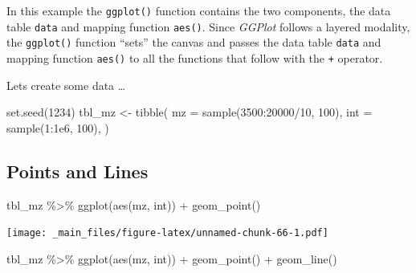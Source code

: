 \documentclass[
]{book}
\newenvironment{Shaded}{\begin{snugshade}}{\end{snugshade}}
\newcommand{\AttributeTok}[1]{\textcolor[rgb]{0.77,0.63,0.00}{#1}}
\newcommand{\DecValTok}[1]{\textcolor[rgb]{0.00,0.00,0.81}{#1}}
\newcommand{\FloatTok}[1]{\textcolor[rgb]{0.00,0.00,0.81}{#1}}
\newcommand{\FunctionTok}[1]{\textcolor[rgb]{0.00,0.00,0.00}{#1}}
\newcommand{\NormalTok}[1]{#1}
\newcommand{\OtherTok}[1]{\textcolor[rgb]{0.56,0.35,0.01}{#1}}
\newcommand{\SpecialCharTok}[1]{\textcolor[rgb]{0.00,0.00,0.00}{#1}}
\begin{document}
In this example the \texttt{ggplot()} function contains the two components, the data table \texttt{data} and mapping function \texttt{aes()}. Since \emph{GGPlot} follows a layered modality, the \texttt{ggplot()} function ``sets'' the canvas and passes the data table \texttt{data} and mapping function \texttt{aes()} to all the functions that follow with the \texttt{+} operator.

Lets create some data \ldots{}

\begin{Shaded}
\begin{Highlighting}[]
\FunctionTok{set.seed}\NormalTok{(}\DecValTok{1234}\NormalTok{)}
\NormalTok{tbl\_mz }\OtherTok{\textless{}{-}} \FunctionTok{tibble}\NormalTok{(}
  \AttributeTok{mz =} \FunctionTok{sample}\NormalTok{(}\DecValTok{3500}\SpecialCharTok{:}\DecValTok{20000}\SpecialCharTok{/}\DecValTok{10}\NormalTok{, }\DecValTok{100}\NormalTok{),}
  \AttributeTok{int =} \FunctionTok{sample}\NormalTok{(}\DecValTok{1}\SpecialCharTok{:}\FloatTok{1e6}\NormalTok{, }\DecValTok{100}\NormalTok{),}
\NormalTok{)}
\end{Highlighting}
\end{Shaded}

\hypertarget{points-and-lines}{%
\subsection{Points and Lines}\label{points-and-lines}}

\begin{Shaded}
\begin{Highlighting}[]
\NormalTok{tbl\_mz }\SpecialCharTok{\%\textgreater{}\%} \FunctionTok{ggplot}\NormalTok{(}\FunctionTok{aes}\NormalTok{(mz, int)) }\SpecialCharTok{+} \FunctionTok{geom\_point}\NormalTok{()}
\end{Highlighting}
\end{Shaded}

\texttt{[image: \_main\_files/figure-latex/unnamed-chunk-66-1.pdf]}

\begin{Shaded}
\begin{Highlighting}[]
\NormalTok{tbl\_mz }\SpecialCharTok{\%\textgreater{}\%} \FunctionTok{ggplot}\NormalTok{(}\FunctionTok{aes}\NormalTok{(mz, int)) }\SpecialCharTok{+} \FunctionTok{geom\_point}\NormalTok{() }\SpecialCharTok{+} \FunctionTok{geom\_line}\NormalTok{()}
\end{Highlighting}
\end{Shaded}
\end{document}
